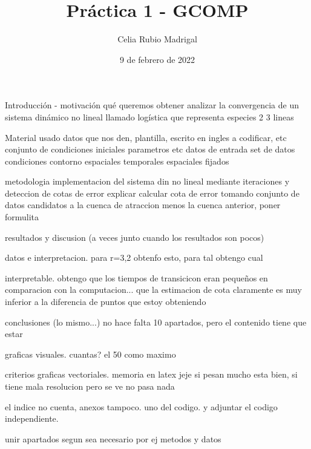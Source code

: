 \documentclass{article}
\author{Celia Rubio Madrigal}
\title{Práctica 1 - GCOMP}
\date{9 de febrero de 2022}
\begin{document}
	\maketitle
	
	Introducción - motivación
	qué queremos obtener
	analizar la convergencia de un sistema dinámico no lineal llamado logística que representa especies 2 3 lineas
	
	Material usado
	datos que nos den, plantilla, escrito en ingles a codificar, etc
	conjunto de condiciones iniciales parametros etc
	datos de entrada
	set de datos
	condiciones
	contorno espaciales temporales espaciales fijados
	
	
	metodologia
	implementacion del sistema din no lineal mediante iteraciones y deteccion de cotas de error explicar calcular cota de error tomando conjunto de datos candidatos a la cuenca de atraccion menos la cuenca anterior, poner formulita
	
	resultados y discusion (a veces junto cuando los resultados son pocos)

	datos e interpretacion.
	para r=3,2 obtenfo esto, para tal obtengo cual
	
	interpretable. obtengo que los tiempos de transicicon eran pequeños en comparacion con la computacion... que la estimacion de cota claramente es muy inferior a la diferencia de puntos que estoy obteniendo
	
	conclusiones (lo mismo...) no hace falta 10 apartados, pero el contenido tiene que estar
	
	graficas visuales. cuantas? el 50 como maximo
	
	criterios graficas vectoriales. memoria en latex jeje si pesan mucho esta bien, si tiene mala resolucion pero se ve no pasa nada
	
	el indice no cuenta, anexos tampoco. uno del codigo. y adjuntar el codigo independiente.	
	
	unir apartados segun sea necesario
	por ej metodos y datos
	
\end{document}

